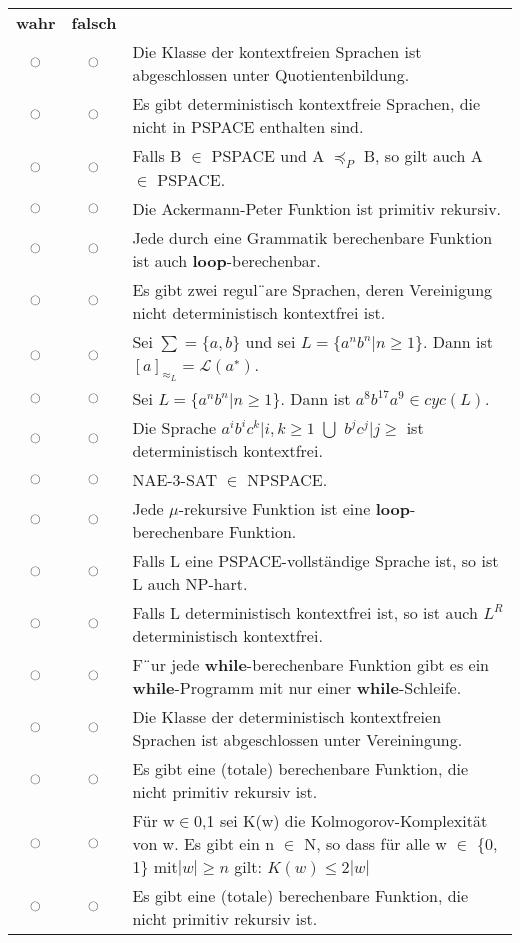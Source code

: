 \documentclass[a4paper,12pt]{article}
\begin{document}
\newpage ~\\
	\begin{tabular}{ccp{}}
		\textbf{wahr} & \textbf{falsch} & ~ \\
		$\ocircle$ & $\ocircle$ & Die Klasse der kontextfreien Sprachen ist abgeschlossen unter Quotientenbildung.\\
		$\ocircle$ & $\ocircle$ & Es gibt deterministisch kontextfreie Sprachen, die nicht in PSPACE enthalten sind.\\
		$\ocircle$ & $\ocircle$ & Falls B $\in$ PSPACE und A $\preceq_P$ B, so gilt auch A $\in$ PSPACE.\\
		$\ocircle$ & $\ocircle$ & Die Ackermann-Peter Funktion ist primitiv rekursiv.\\
		$\ocircle$ & $\ocircle$ & Jede durch eine Grammatik berechenbare Funktion ist auch \textbf{loop}-berechenbar.\\
		$\ocircle$ & $\ocircle$ & Es gibt zwei regul¨are Sprachen, deren Vereinigung nicht deterministisch kontextfrei ist.\\
		$\ocircle$ & $\ocircle$ & Sei $\sum = \{a, b\}$ und sei $L = \{a^nb^n | n \geq 1\}$. Dann ist $[a]_{\approx_L} = \mathcal{L}(a^∗)$.\\
		$\ocircle$ & $\ocircle$ & Sei $L = \{a^nb^n | n \geq 1\}$. Dann ist $a^8b^{17}a^9 \in cyc(L).$\\
		$\ocircle$ & $\ocircle$ & Die Sprache {$a^ib^ic^k | i, k \geq 1$} $\bigcup$ {$b^jc^j | j \geq $} ist deterministisch kontextfrei.\\
		$\ocircle$ & $\ocircle$ & NAE-3-SAT $\in$ NPSPACE.\\
		$\ocircle$ & $\ocircle$ & Jede $\mu$-rekursive Funktion ist eine \textbf{loop}-berechenbare Funktion.\\
		$\ocircle$ & $\ocircle$ & Falls L eine PSPACE-vollst\"andige Sprache ist, so ist L auch NP-hart.\\
		$\ocircle$ & $\ocircle$ & Falls L deterministisch kontextfrei ist, so ist auch $L^R$ deterministisch kontextfrei.\\
		$\ocircle$ & $\ocircle$ & F¨ur jede \textbf{while}-berechenbare Funktion gibt es ein \textbf{while}-Programm mit nur einer \textbf{while}-Schleife.\\
		$\ocircle$ & $\ocircle$ & Die Klasse der deterministisch kontextfreien Sprachen ist abgeschlossen unter Vereiningung.\\
		$\ocircle$ & $\ocircle$ & Es gibt eine (totale) berechenbare Funktion, die nicht primitiv rekursiv ist.\\
		$\ocircle$ & $\ocircle$ & F\"ur w$\in${0,1} sei K(w) die Kolmogorov-Komplexit\"at von w. Es gibt ein n $\in$ N, so dass f\"ur alle w $\in$ \{0, 1\} mit$ |w| \geq n$ gilt: $K(w) \leq 2|w|$\\
		$\ocircle$ & $\ocircle$ & Es gibt eine (totale) berechenbare Funktion, die nicht primitiv rekursiv ist.\\
	\end{tabular}
	
\end{document}
